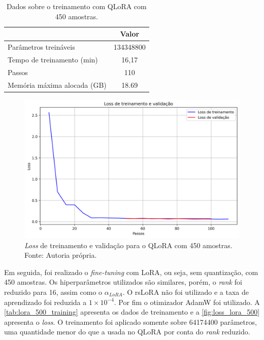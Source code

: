 \begin{table}[ht]
    \caption{\small Dados sobre o treinamento com \ac{QLoRA} com 450 amostras.}
    \centering
    \begin{tabular}{l|c}
        \hline
                                    & Valor     \\ \hline
        Parâmetros treináveis       & 134348800 \\
        Tempo de treinamento (min)  & 16,17     \\
        Passos                      & 110       \\
        Memória máxima alocada (GB) & 18.69     \\ \hline
    \end{tabular}
    \label{tab:qlora_500_training}
\end{table}

\clearpage

\begin{figure}[ht]
    \centering
    \includegraphics[width=0.8\columnwidth,keepaspectratio]{images/loss_qlora_500.png}
    \caption{\small \textit{Loss} de treinamento e validação para o \ac{QLoRA} com 450 amostras. Fonte: Autoria própria.}
    \label{fig:loss_qlora_500}
\end{figure}

Em seguida, foi realizado o \textit{fine-tuning} com \ac{LoRA}, ou seja, sem quantização, com 450 amostras. Os hiperparâmetros utilizados são similares, porém, o
\textit{rank} foi reduzido para 16, assim como o \begin{math}\alpha_{LoRA}\end{math}. O \ac{rsLoRA} não foi utilizado e a taxa de aprendizado foi reduzida a
\begin{math}1 \times 10^{-4}\end{math}. Por fim o otimizador \ac{AdamW} foi utilizado. A \autoref{tab:lora_500_training} apresenta os dados de treinamento e a
\autoref{fig:loss_lora_500} apresenta o \textit{loss}. O treinamento foi aplicado somente sobre 64174400 parâmetros, uma quantidade menor do que a usada no
\ac{QLoRA} por conta do \textit{rank} reduzido.

